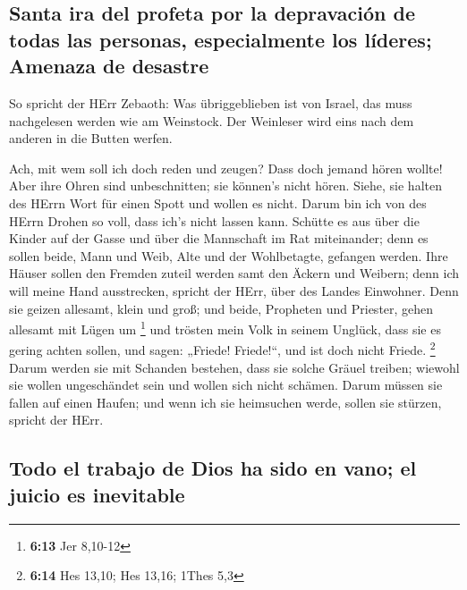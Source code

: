 \hypertarget{santa-ira-del-profeta-por-la-depravaciuxf3n-de-todas-las-personas-especialmente-los-luxedderes-amenaza-de-desastre}{%
\subsection{Santa ira del profeta por la depravación de todas las
personas, especialmente los líderes; Amenaza de
desastre}\label{santa-ira-del-profeta-por-la-depravaciuxf3n-de-todas-las-personas-especialmente-los-luxedderes-amenaza-de-desastre}}

 So spricht der HErr Zebaoth: Was übriggeblieben ist von
Israel, das muss nachgelesen werden wie am Weinstock. Der Weinleser wird
eins nach dem anderen in die Butten werfen.

 Ach, mit wem soll ich doch reden und zeugen? Dass doch
jemand hören wollte! Aber ihre Ohren sind unbeschnitten; sie können's
nicht hören. Siehe, sie halten des HErrn Wort für einen Spott und wollen
es nicht.  Darum bin ich von des HErrn Drohen so voll,
dass ich's nicht lassen kann. Schütte es aus über die Kinder auf der
Gasse und über die Mannschaft im Rat miteinander; denn es sollen beide,
Mann und Weib, Alte und der Wohlbetagte, gefangen werden.
 Ihre Häuser sollen den Fremden zuteil werden samt den
Äckern und Weibern; denn ich will meine Hand ausstrecken, spricht der
HErr, über des Landes Einwohner.  Denn sie geizen
allesamt, klein und groß; und beide, Propheten und Priester, gehen
allesamt mit Lügen um \footnote{\textbf{6:13} Jer 8,10-12}
 und trösten mein Volk in seinem Unglück, dass sie es
gering achten sollen, und sagen: „Friede! Friede!{}``, und ist doch
nicht Friede. \footnote{\textbf{6:14} Hes 13,10; Hes 13,16; 1Thes 5,3}
 Darum werden sie mit Schanden bestehen, dass sie solche
Gräuel treiben; wiewohl sie wollen ungeschändet sein und wollen sich
nicht schämen. Darum müssen sie fallen auf einen Haufen; und wenn ich
sie heimsuchen werde, sollen sie stürzen, spricht der HErr.

\hypertarget{todo-el-trabajo-de-dios-ha-sido-en-vano-el-juicio-es-inevitable}{%
\subsection{Todo el trabajo de Dios ha sido en vano; el juicio es
inevitable}\label{todo-el-trabajo-de-dios-ha-sido-en-vano-el-juicio-es-inevitable}}

